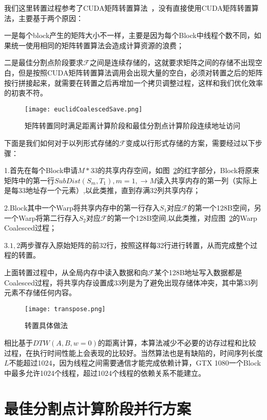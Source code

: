我们这里转置过程参考了CUDA矩阵转置算法~\cite{ruetsch2009optimizing}，没有直接使用CUDA矩阵转置算法，主要基于两个原因：

一是每个block产生的矩阵大小不一样，主要是因为每个Block中线程个数不同，如果统一使用相同的矩阵转置算法会造成计算资源的浪费；

二是最佳分割点阶段要求$\mathcal{F}$之间是连续存储的，这就要求矩阵之间的存储不出现空白，但是按照CUDA矩阵转置算法调用会出现大量的空白，必须对转置之后的矩阵按行拼接起来，就需要在转置之后再增加一个拷贝调整过程，这样和我们优化效率的初衷不符。

\begin{figure}[H] %
	\centering
	\texttt{[image: euclidCoalescedSave.png]}
	\caption{矩阵转置同时满足距离计算阶段和最佳分割点计算阶段连续地址访问}
	\label{fig:euclidCoalescedSave}
\end{figure}

下面是我们如何对于以列形式存储的$\mathcal{F}$变成以行形式存储的方案，需要经过以下步骤：

1.首先在每个Block申请$M*33$的共享内存空间，如图~\ref{fig:transpose}的红字部分，Block将原来矩阵中的第一行$SubDist(S_m,T_1),m=1,\to M$读入共享内存的第一列（实际上是每33地址存一个元素）,以此类推，直到存满32列共享内存；

2.Block其中一个Warp将共享内存中的第一行存入$S_1$对应$\mathcal{F}$的第一个128B空间，另一个Warp将第二行存入$S_2$对应$\mathcal{F}$的第一个128B空间,以此类推，对应图~\ref{fig:transpose}的Warp Coalesced过程；

3.$1,2$两步骤存入原始矩阵的前32行，按照这样每32行进行转置，从而完成整个过程的转置。

上面转置过程中，从全局内存中读入数据和向$\mathcal{F}$某个128B地址写入数据都是Coalesced过程，将共享内存设置成33列是为了避免出现存储体冲突，其中第33列元素不存储任何内容。

\begin{figure}[H] %
	\centering
	\texttt{[image: transpose.png]}
	\caption{转置具体做法}
	\label{fig:transpose}
\end{figure}

相比基于$DTW(A,B,w=0)$的距离计算，本算法减少不必要的访存过程和比较过程，在执行时间性能上会表现的比较好。当然算法也是有缺陷的，时间序列长度$L$不能超过1024，因为线程之间需要通信才能完成依赖计算，GTX 1080一个Block中最多允许1024个线程，超过1024个线程的依赖关系不能建立。

\section{最佳分割点计算阶段并行方案}
\label{cha:chap04:myalg:infogain}

